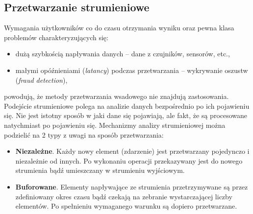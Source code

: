 
\subsection{Przetwarzanie strumieniowe}

Wymagania użytkowników co do czasu otrzymania wyniku
oraz pewna klasa problemów charakteryzujących się:
\begin{itemize}
	\item dużą szybkością napływania danych -- dane z czujników, sensorów, etc.,
	\item małymi opóźnieniami (\textit{latancy}) podczas przetwarzania -- wykrywanie oszustw (\textit{fraud detection}),
\end{itemize}
powodują,
że metody przetwarzania wsadowego nie znajdują zastosowania.
Podejście strumieniowe polega na analizie danych bezpośrednio po ich pojawieniu się.
Nie jest istotny sposób w jaki dane się pojawiają,
ale fakt,
że są procesowane natychmiast po pojawieniu się.
Mechanizmy analizy strumieniowej można podzielić na 2 typy z uwagi na sposób przetwarzania:
\begin{itemize}
	\item \textbf{Niezależne}.
	Każdy nowy element (zdarzenie) jest przetwarzany pojedynczo i niezależnie od innych.
	Po wykonaniu operacji przekazywany jest do nowego strumienia bądź umieszczany w strumieniu wyjściowym.
	\item \textbf{Buforowane}.
	Elementy napływające ze strumienia przetrzymywane są przez zdefiniowany okres czasu
	bądź czekają na zebranie wystarczającej liczby elementów.
	Po spełnieniu wymaganego warunku są dopiero przetwarzane.
\end{itemize}

